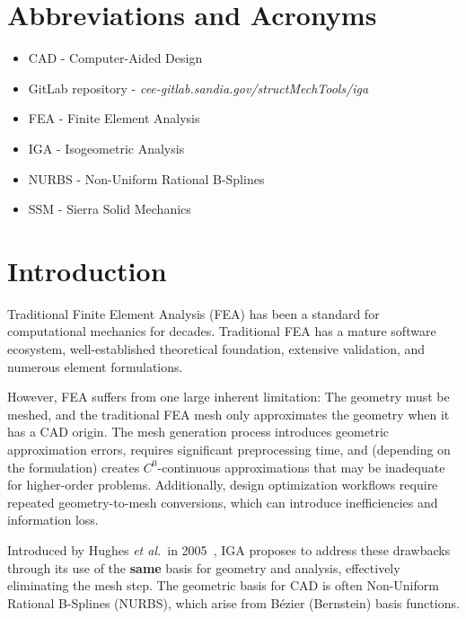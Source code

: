 \documentclass[12pt,report,justified]{SANDreport}
\begin{document}
%
\SANDmain		%

\chapter*{Abbreviations and Acronyms}
\begin{itemize}
\item CAD - Computer-Aided Design
\item GitLab repository - {\em cee-gitlab.sandia.gov/structMechTools/iga}
\item FEA - Finite Element Analysis
\item IGA - Isogeometric Analysis
\item NURBS - Non-Uniform Rational B-Splines
\item SSM - Sierra Solid Mechanics
\end{itemize}

\chapter{Introduction}
\label{Intro}


Traditional Finite Element Analysis (FEA) has been a standard for computational mechanics for decades.  Traditional FEA has a mature software ecosystem, well-established theoretical foundation, extensive validation, and numerous element formulations.

However, FEA suffers from one large inherent limitation:  The geometry must be meshed, and the traditional FEA mesh only approximates the geometry when it has a CAD origin.  The mesh generation process introduces geometric approximation errors, requires significant preprocessing time, and (depending on the formulation) creates $C^0$-continuous approximations that may be inadequate for higher-order problems.  Additionally, design optimization workflows require repeated geometry-to-mesh conversions, which can introduce inefficiencies and information loss.

Introduced by Hughes {\em et al.}~in 2005~\cite{Hughes2005Isogeometric},
IGA proposes to address these drawbacks through its use of the {\bf same} basis
for geometry and analysis, effectively eliminating the mesh step.
The geometric basis for CAD is often Non-Uniform Rational
B-Splines (NURBS), which arise from B{\'e}zier (Bernstein) basis functions.  
\end{document}
